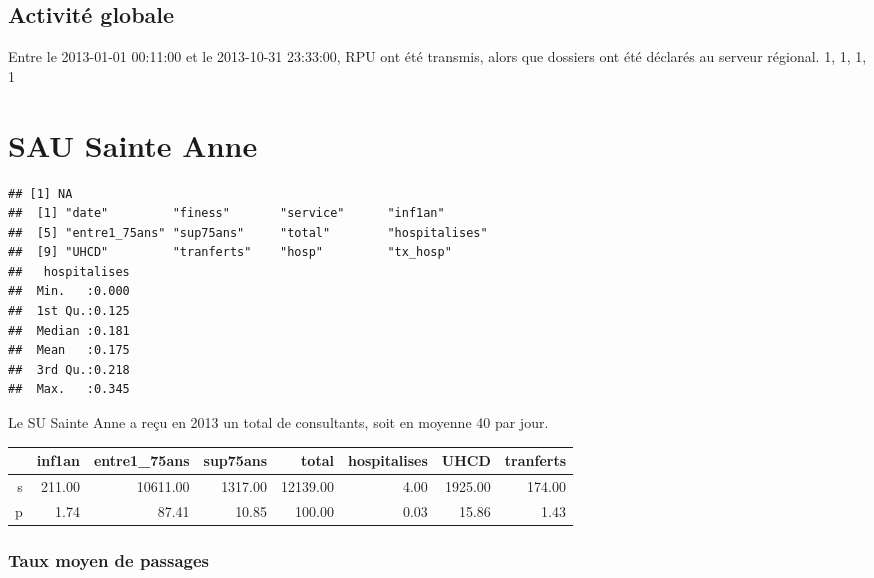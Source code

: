 \documentclass[12pt,english,french,twoside]{report}\usepackage[]{graphicx}\usepackage[]{color}
\makeatletter
\newenvironment{kframe}{%
 \def\at@end@of@kframe{}%
 \ifinner\ifhmode%
  \def\at@end@of@kframe{\end{minipage}}%
  \begin{minipage}{\columnwidth}%
 \fi\fi%
 \def\FrameCommand##1{\hskip\@totalleftmargin \hskip-\fboxsep
 \colorbox{shadecolor}{##1}\hskip-\fboxsep
     \hskip-\linewidth \hskip-\@totalleftmargin \hskip\columnwidth}%
 \MakeFramed {\advance\hsize-\width
   \@totalleftmargin\z@ \linewidth\hsize
   \@setminipage}}%
 {\par\unskip\endMakeFramed%
 \at@end@of@kframe}
\newenvironment{knitrout}{}{} %
\makeatother
\begin{document}
\section{Activité globale}




Entre le 2013-01-01 00:11:00 et le 2013-10-31 23:33:00,  RPU ont été transmis, alors que  dossiers ont été déclarés au serveur régional. 
1, 1, 1, 1


\chapter{SAU Sainte Anne}


\begin{knitrout}
\color{fgcolor}\begin{kframe}
\begin{verbatim}
## [1] NA
##  [1] "date"         "finess"       "service"      "inf1an"      
##  [5] "entre1_75ans" "sup75ans"     "total"        "hospitalises"
##  [9] "UHCD"         "tranferts"    "hosp"         "tx_hosp"
##   hospitalises  
##  Min.   :0.000  
##  1st Qu.:0.125  
##  Median :0.181  
##  Mean   :0.175  
##  3rd Qu.:0.218  
##  Max.   :0.345
\end{verbatim}
\end{kframe}
\end{knitrout}


Le SU Sainte Anne a reçu en 2013 un total de  consultants, soit en moyenne 40 par jour.

\begin{table}[ht]
\centering
\begin{tabular}{rrrrrrrr}
  \hline
 & inf1an & entre1\_75ans & sup75ans & total & hospitalises & UHCD & tranferts \\ 
  \hline
s & 211.00 & 10611.00 & 1317.00 & 12139.00 & 4.00 & 1925.00 & 174.00 \\ 
  p & 1.74 & 87.41 & 10.85 & 100.00 & 0.03 & 15.86 & 1.43 \\ 
   \hline
\end{tabular}
\end{table}



\subsection{Taux moyen de passages}
\end{document}
